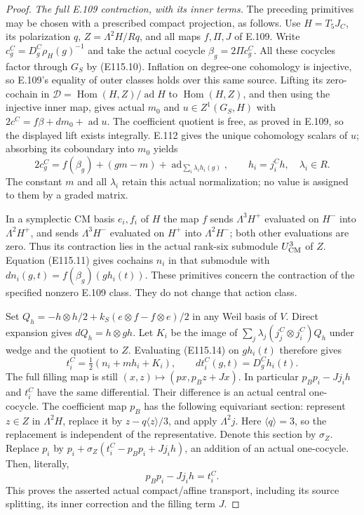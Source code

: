 \begin{proof}
\emph{The full E.109 contraction, with its inner terms.}
The preceding primitives may be chosen with a prescribed
compact projection, as follows.  Use $H=T_5J_C$, its
polarization $q$, $Z=\Lambda^2H/Rq$, and all maps $f,\Pi,J$
of E.109.  Write $c^C_g=D^C_g\rho_H(g)^{-1}$ and take the
actual cocycle $\beta_g=2\Pi c^C_g$.
All these cocycles factor through $G_S$ by (E115.10).
Inflation on degree-one cohomology is injective, so E.109's
equality of outer classes holds over this same source.
Lifting its zero-cochain in
$\mathcal D=\operatorname{Hom}(H,Z)/\operatorname{ad}H$
to $\operatorname{Hom}(H,Z)$, and then using the injective
inner map, gives actual $m_0$ and $u\in Z^1(G_S,H)$ with
$2c^C=f\beta+dm_0+\operatorname{ad}u$.
The coefficient quotient is free, as proved in E.109,
so the displayed lift exists integrally.
E.112 gives the unique cohomology scalars of $u$;
absorbing its coboundary into $m_0$ yields
\[
 2c^C_g=f(\beta_g)+(gm-m)
              +\operatorname{ad}_{\sum_i\lambda_i h_i(g)},
 \qquad h_i=j_i^C h,\quad\lambda_i\in R.
 \tag{E115.14}
\]
The constant $m$ and all $\lambda_i$ retain this actual
normalization; no value is assigned to them by a graded matrix.

In a symplectic CM basis $e_i,f_i$ of $H$ the map $f$
sends $\Lambda^3H^+$ evaluated on $H^-$ into
$\Lambda^2H^+$, and sends $\Lambda^3H^-$ evaluated on
$H^+$ into $\Lambda^2H^-$; both other evaluations are zero.
Thus its contraction lies in the actual rank-six submodule
$U_{\rm CM}^3$ of $Z$.  Equation (E115.11) gives cochains
$n_i$ in that submodule with
$dn_i(g,t)=f(\beta_g)(g h_i(t))$.
These primitives concern the contraction of the specified
nonzero E.109 class.  They do not change that action class.

Set
$Q_h=-h\otimes h/2+k_S(e\otimes f-f\otimes e)/2$
in any Weil basis of $V$.
Direct expansion gives $dQ_h=h\otimes gh$.
Let $K_i$ be the image of
$\sum_j\lambda_j(j_j^C\otimes j_i^C)Q_h$ under wedge and
the quotient to $Z$.  Evaluating (E115.14) on $g h_i(t)$
therefore gives
\[
 t_i^C=\tfrac12(n_i+m h_i+K_i),\qquad
 dt_i^C(g,t)=D^C_g h_i(t).
 \tag{E115.15}
\]
The full filling map is still
$(x,z)\mapsto(px,p_Bz+Jx)$.
In particular $p_Bp_i-Jj_i h$ and $t_i^C$ have the same
differential.  Their difference is an actual central
one-cocycle.
The coefficient map $p_B$ has the following equivariant
section: represent $z\in Z$ in $\Lambda^2H$, replace it by
$z-q\langle z\rangle/3$, and apply $\Lambda^2j$.
Here $\langle q\rangle=3$, so the replacement is independent
of the representative.  Denote this section by $\sigma_Z$.
Replace $p_i$ by
$p_i+\sigma_Z(t_i^C-p_Bp_i+Jj_i h)$, an addition of an
actual one-cocycle.
Then, literally,
\[
                 p_Bp_i-Jj_i h=t_i^C.
 \tag{E115.16}
\]
This proves the asserted actual compact/affine transport,
including its source splitting, its inner correction and
the filling term $J$.


\end{proof}
